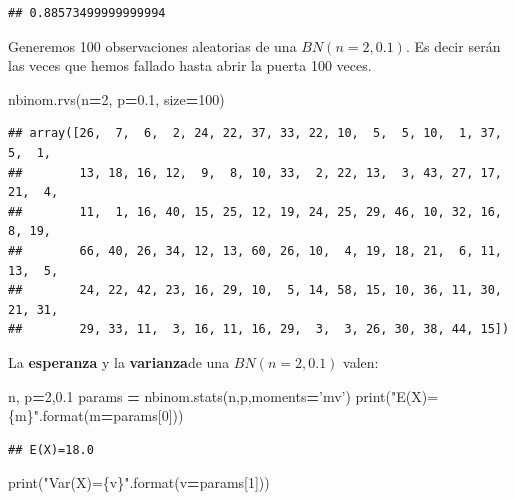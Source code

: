 \documentclass[]{book}
\newenvironment{Shaded}{\begin{snugshade}}{\end{snugshade}}
\newcommand{\BuiltInTok}[1]{#1}
\newcommand{\DecValTok}[1]{\textcolor[rgb]{0.00,0.00,0.81}{#1}}
\newcommand{\FloatTok}[1]{\textcolor[rgb]{0.00,0.00,0.81}{#1}}
\newcommand{\NormalTok}[1]{#1}
\newcommand{\OperatorTok}[1]{\textcolor[rgb]{0.81,0.36,0.00}{\textbf{#1}}}
\newcommand{\SpecialCharTok}[1]{\textcolor[rgb]{0.00,0.00,0.00}{#1}}
\newcommand{\StringTok}[1]{\textcolor[rgb]{0.31,0.60,0.02}{#1}}
\begin{document}
\begin{verbatim}
## 0.88573499999999994
\end{verbatim}

Generemos 100 observaciones aleatorias de una \(BN(n=2,0.1)\). Es decir serán las veces que hemos fallado hasta abrir la puerta 100 veces.

\begin{Shaded}
\begin{Highlighting}[]
\NormalTok{nbinom.rvs(n}\OperatorTok{=}\DecValTok{2}\NormalTok{, p}\OperatorTok{=}\FloatTok{0.1}\NormalTok{, size}\OperatorTok{=}\DecValTok{100}\NormalTok{)}
\end{Highlighting}
\end{Shaded}

\begin{verbatim}
## array([26,  7,  6,  2, 24, 22, 37, 33, 22, 10,  5,  5, 10,  1, 37,  5,  1,
##        13, 18, 16, 12,  9,  8, 10, 33,  2, 22, 13,  3, 43, 27, 17, 21,  4,
##        11,  1, 16, 40, 15, 25, 12, 19, 24, 25, 29, 46, 10, 32, 16,  8, 19,
##        66, 40, 26, 34, 12, 13, 60, 26, 10,  4, 19, 18, 21,  6, 11, 13,  5,
##        24, 22, 42, 23, 16, 29, 10,  5, 14, 58, 15, 10, 36, 11, 30, 21, 31,
##        29, 33, 11,  3, 16, 11, 16, 29,  3,  3, 26, 30, 38, 44, 15])
\end{verbatim}

La \textbf{esperanza} y la \textbf{varianza}de una \(BN(n=2,0.1)\) valen:

\begin{Shaded}
\begin{Highlighting}[]
\NormalTok{n, p}\OperatorTok{=}\DecValTok{2}\NormalTok{,}\FloatTok{0.1}
\NormalTok{params }\OperatorTok{=}\NormalTok{ nbinom.stats(n,p,moments}\OperatorTok{=}\StringTok{'mv'}\NormalTok{)}
\BuiltInTok{print}\NormalTok{(}\StringTok{"E(X)=}\SpecialCharTok{\{m\}}\StringTok{"}\NormalTok{.}\BuiltInTok{format}\NormalTok{(m}\OperatorTok{=}\NormalTok{params[}\DecValTok{0}\NormalTok{]))}
\end{Highlighting}
\end{Shaded}

\begin{verbatim}
## E(X)=18.0
\end{verbatim}

\begin{Shaded}
\begin{Highlighting}[]
\BuiltInTok{print}\NormalTok{(}\StringTok{"Var(X)=}\SpecialCharTok{\{v\}}\StringTok{"}\NormalTok{.}\BuiltInTok{format}\NormalTok{(v}\OperatorTok{=}\NormalTok{params[}\DecValTok{1}\NormalTok{]))}
\end{Highlighting}
\end{Shaded}
\end{document}
